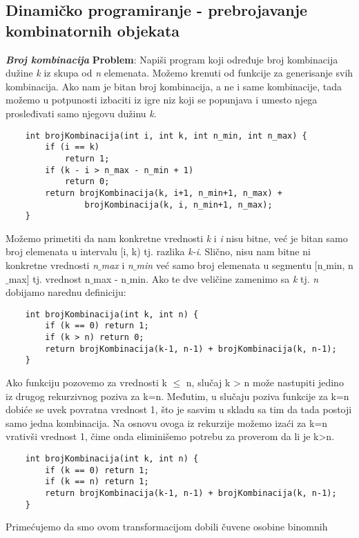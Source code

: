 \documentclass{article}
\begin{document}
\subsection{Dinamičko programiranje - prebrojavanje kombinatornih objekata}
\textbf{\textit{Broj kombinacija}}
\vspace{0.2cm}\newline
\textbf{Problem}: Napiši program koji određuje broj kombinacija dužine \textit{k} iz skupa od \textit{n} elemenata.
\newline
Možemo krenuti od funkcije za generisanje svih kombinacija. Ako nam je bitan broj kombinacija,
a ne i same kombinacije, tada možemo u potpunosti izbaciti iz igre niz koji se
popunjava i umesto njega prosleđivati samo njegovu dužinu \textit{k}.
\begin{lstlisting}
    int brojKombinacija(int i, int k, int n_min, int n_max) {
        if (i == k) 
            return 1;
        if (k - i > n_max - n_min + 1)
            return 0;
        return brojKombinacija(k, i+1, n_min+1, n_max) +
                brojKombinacija(k, i, n_min+1, n_max);
    }
\end{lstlisting}
Možemo primetiti da nam konkretne vrednosti \textit{k} i \textit{i} nisu bitne, već je bitan
samo broj elemenata u intervalu [i, k) tj. razlika \textit{k-i}. Slično, nisu nam
bitne ni konkretne vrednosti \textit{n$\_$max} i \textit{n$\_$min} već samo broj elemenata u segmentu
[n$\_$min, n$\_$max] tj. vrednost n$\_$max - n$\_$min. Ako te dve veličine zamenimo sa \textit{k}
tj. \textit{n} dobijamo narednu definiciju:
\begin{lstlisting}
    int brojKombinacija(int k, int n) {
        if (k == 0) return 1;
        if (k > n) return 0;
        return brojKombinacija(k-1, n-1) + brojKombinacija(k, n-1);
    }
\end{lstlisting}
Ako funkciju pozovemo za vrednosti k $\leq$ n, slučaj k > n može nastupiti jedino iz
drugog rekurzivnog poziva za k=n. Međutim, u slučaju
poziva funkcije za k=n dobiće se uvek povratna vrednost 1, što je sasvim u skladu sa tim da tada postoji samo jedna kombinacija.
Na osnovu ovoga iz rekurzije možemo izaći za k=n vrativši vrednost 1, čime onda
eliminišemo potrebu za proverom da li je k>n.
\begin{lstlisting}
    int brojKombinacija(int k, int n) {
        if (k == 0) return 1;
        if (k == n) return 1;
        return brojKombinacija(k-1, n-1) + brojKombinacija(k, n-1);
    }
\end{lstlisting}
Primećujemo da smo ovom transformacijom dobili čuvene osobine binomnih
\end{document}
